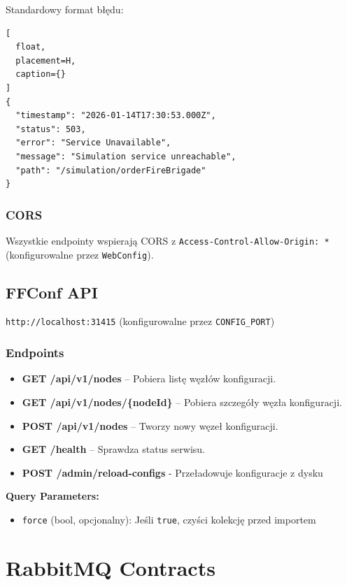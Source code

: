 Standardowy format błędu:
\begin{lstlisting}[
  float,
  placement=H,
  caption={}
]
{
  "timestamp": "2026-01-14T17:30:53.000Z",
  "status": 503,
  "error": "Service Unavailable",
  "message": "Simulation service unreachable",
  "path": "/simulation/orderFireBrigade"
}
\end{lstlisting}

\subsubsection{CORS}

Wszystkie endpointy wspierają CORS z \texttt{Access-Control-Allow-Origin: *} (konfigurowalne przez \texttt{WebConfig}).

\subsection{FFConf API}

\texttt{http://localhost:31415} (konfigurowalne przez \texttt{CONFIG\_PORT})

\subsubsection{Endpoints}

\begin{itemize}
  \item \textbf{GET /api/v1/nodes} -- Pobiera listę węzłów konfiguracji.
  \item \textbf{GET /api/v1/nodes/\{nodeId\}} -- Pobiera szczegóły węzła konfiguracji.
  \item \textbf{POST /api/v1/nodes} -- Tworzy nowy węzeł konfiguracji.
  \item \textbf{GET /health} -- Sprawdza status serwisu.
  \item \textbf{POST /admin/reload-configs} - Przeładowuje konfiguracje z dysku
\end{itemize}

\textbf{Query Parameters:}
\begin{itemize}
    \item \texttt{force} (bool, opcjonalny): Jeśli \texttt{true}, czyści kolekcję przed importem
\end{itemize}

\section{RabbitMQ Contracts}

